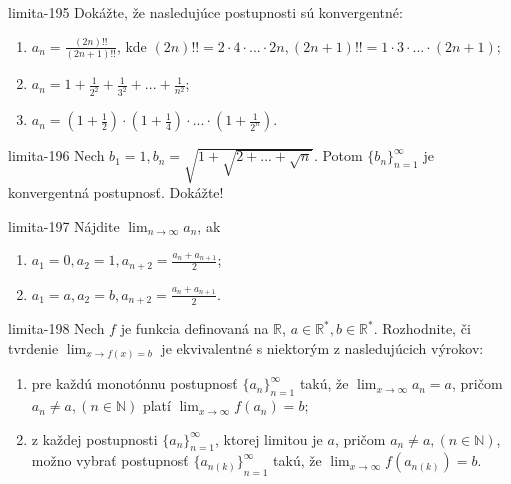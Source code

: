 \begin{defproblem}{limita-195}
Dokážte, že nasledujúce postupnosti sú konvergentné:
\begin{enumerate}
\item $a_n=\frac{(2n)!!}{(2n+1)!!}$, kde $(2n)!!=2\cdot4\cdot...\cdot2n,(2n+1)!!=1\cdot3\cdot...\cdot(2n+1)$;
\item $a_n=1+\frac{1}{2^2}+\frac{1}{3^2}+...+\frac{1}{n^2}$;
\item $a_n=(1+\frac{1}{2})\cdot(1+\frac{1}{4})\cdot...\cdot(1+\frac{1}{2^n})$.
\end{enumerate}
\end{defproblem}

\begin{defproblem}{limita-196}
Nech $b_1=1,b_n=\sqrt{1+\sqrt{2+...+\sqrt{n}}}$. Potom ${\{b_n\}}_{n=1}^\infty$ je konvergentná postupnosť. Dokážte!
\end{defproblem}

\begin{defproblem}{limita-197}
Nájdite $\lim_{n \rightarrow \infty} a_n$, ak
\begin{multicols}{2}
\begin{enumerate}
    \item $a_1=0,a_2=1,a_{n+2}=\frac{a_n+a_{n+1}}{2}$;
    \item $a_1=a,a_2=b,a_{n+2}=\frac{a_n+a_{n+1}}{2}$.
\end{enumerate}
\end{multicols}
\end{defproblem}

\begin{defproblem}{limita-198}
Nech $f$ je funkcia definovaná na $\mathbb{R}$, $a \in \mathbb{R^*},b \in \mathbb{R^*}$. Rozhodnite, či tvrdenie $\lim_{x \rightarrow f(x)=b}$ je ekvivalentné s niektorým z nasledujúcich výrokov:
\begin{enumerate}
\item pre každú monotónnu postupnosť ${\{a_n\}}_{n=1}^\infty$ takú, že $\lim_{x \rightarrow \infty} a_n=a$, pričom $a_n \neq a,(n \in \mathbb{N})$ platí $\lim_{x \rightarrow \infty} f(a_n)=b$;
\item z každej postupnosti ${\{a_n\}}_{n=1}^\infty$, ktorej limitou je $a$, pričom $a_n \neq a ,(n \in \mathbb{N})$, možno vybrať postupnosť ${\{a_{n(k)}\}}_{n=1}^\infty$ takú, že $\lim_{x \rightarrow \infty} f(a_{n(k)})=b$.
\end{enumerate}
\end{defproblem}

